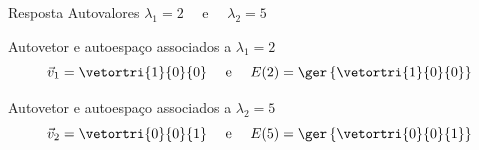 \begin{resolution}{Resposta}
  Autovalores
  \(
    \lambda_{1} = 2
    \quad\text{ e }\quad
    \lambda_{2} = 5
  \)

  \pause
  Autovetor e autoespaço associados a \(\lambda_{1} = 2\)
  \[
    \vec{v}_1 = \vetortri{1}{0}{0}
    \quad\text{ e }\quad
    E(2) = \ger\left\{ \vetortri{1}{0}{0} \right\}
  \]

  \pause
  Autovetor e autoespaço associados a \(\lambda_{2} = 5\)
  \[
    \vec{v}_2 = \vetortri{0}{0}{1}
    \quad\text{ e }\quad
    E(5) = \ger\left\{ \vetortri{0}{0}{1} \right\}
  \]
\end{resolution}

\endinput
